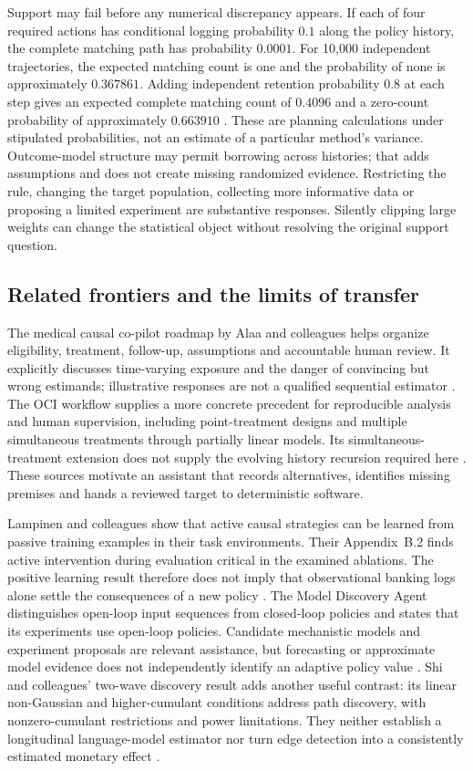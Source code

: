 Support may fail before any numerical discrepancy appears. If each of
four required actions has conditional logging probability $0.1$ along
the policy history, the complete matching path has probability $0.0001$.
For 10,000 independent trajectories, the expected matching count is one
and the probability of none is approximately $0.367861$.
Adding independent retention probability $0.8$ at each step gives an
expected complete matching count of $0.4096$ and a zero-count probability
of approximately $0.663910$
\citep{exec16_longpolicy_oracle}. These are planning calculations under
stipulated probabilities, not an estimate of a particular method's
variance. Outcome-model structure may permit borrowing across histories;
that adds assumptions and does not create missing randomized evidence.
Restricting the rule, changing the target population, collecting more
informative data or proposing a limited experiment are substantive
responses. Silently clipping large weights can change the statistical
object without resolving the original support question.

\subsection{Related frontiers and the limits of transfer}

The medical causal co-pilot roadmap by Alaa and colleagues helps organize
eligibility, treatment, follow-up, assumptions and accountable human
review. It explicitly discusses time-varying exposure and the danger of
convincing but wrong estimands; illustrative responses are not a
qualified sequential estimator
\citep{v12_la_2407_19118}.
The OCI workflow supplies a more concrete precedent for reproducible
analysis and human supervision, including point-treatment designs and
multiple simultaneous treatments through partially linear models.
Its simultaneous-treatment extension does not supply the evolving
history recursion required here
\citep{v12_la_2607_22443}.
These sources motivate an assistant that records alternatives, identifies
missing premises and hands a reviewed target to deterministic software.

Lampinen and colleagues show that active causal strategies can be
learned from passive training examples in their task environments.
Their Appendix~B.2 finds active intervention during evaluation critical
in the examined ablations. The positive learning result therefore does
not imply that observational banking logs alone settle the consequences
of a new policy
\citep{v12_la_2305_16183}.
The Model Discovery Agent distinguishes open-loop input sequences from
closed-loop policies and states that its experiments use open-loop
policies. Candidate mechanistic models and experiment proposals are
relevant assistance, but forecasting or approximate model evidence does
not independently identify an adaptive policy value
\citep{v12_la_2608_09696}.
Shi and colleagues' two-wave discovery result adds another useful
contrast: its linear non-Gaussian and higher-cumulant conditions address
path discovery, with nonzero-cumulant restrictions and power limitations.
They neither establish a longitudinal language-model estimator nor turn
edge detection into a consistently estimated monetary effect
\citep{exec15_latent_shi}.


